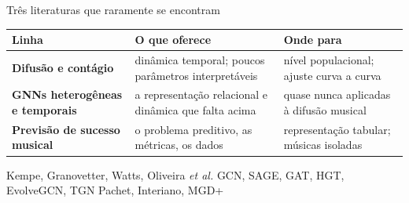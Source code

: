\documentclass[aspectratio=169]{beamer}
\newcommand{\azul}[1]{\textcolor{ufprA}{\textbf{#1}}}
\begin{document}
\begin{frame}{Três literaturas que raramente se encontram}
  \small
  \begin{table}
  \renewcommand{\arraystretch}{1.4}
  \begin{tabular}{p{3.0cm}p{3.9cm}p{4.4cm}}
  \toprule
  \textbf{Linha} & \textbf{O que oferece} & \textbf{Onde para} \\
  \midrule
  \azul{Difusão e contágio}
  & dinâmica temporal; poucos parâmetros interpretáveis
  & nível populacional; ajuste curva a curva \\
  \azul{GNNs heterogêneas e temporais}
  & a representação relacional e dinâmica que falta acima
  & quase nunca aplicadas à difusão musical \\
  \azul{Previsão de sucesso musical}
  & o problema preditivo, as métricas, os dados
  & representação tabular; músicas isoladas \\
  \bottomrule
  \end{tabular}
  \end{table}
  \vfill
  {\footnotesize\color{cinza} Kempe, Granovetter, Watts, Oliveira \emph{et al.} \textbullet{}
  GCN, SAGE, GAT, HGT, EvolveGCN, TGN \textbullet{} Pachet, Interiano, MGD+}
\end{frame}

\end{document}
